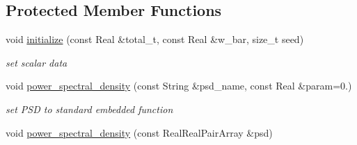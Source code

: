 \subsection*{Protected Member Functions}
\begin{DoxyCompactItemize}
\item 
void \hyperlink{classPecos_1_1InverseTransformation_aff7310eaa8322a3eccf9815cc7da4a8e}{initialize} (const Real \&total\+\_\+t, const Real \&w\+\_\+bar, size\+\_\+t seed)\label{classPecos_1_1InverseTransformation_aff7310eaa8322a3eccf9815cc7da4a8e}

\begin{DoxyCompactList}\small\item\em set scalar data \end{DoxyCompactList}\item 
void \hyperlink{classPecos_1_1InverseTransformation_a2f54b6bae76157d4a964cd3ff73e4947}{power\+\_\+spectral\+\_\+density} (const String \&psd\+\_\+name, const Real \&param=0.)\label{classPecos_1_1InverseTransformation_a2f54b6bae76157d4a964cd3ff73e4947}

\begin{DoxyCompactList}\small\item\em set P\+SD to standard embedded function \end{DoxyCompactList}\item 
void \hyperlink{classPecos_1_1InverseTransformation_a97ff15b18230b747c64cde3596a1d6f3}{power\+\_\+spectral\+\_\+density} (const Real\+Real\+Pair\+Array \&psd)
\end{DoxyCompactItemize}
